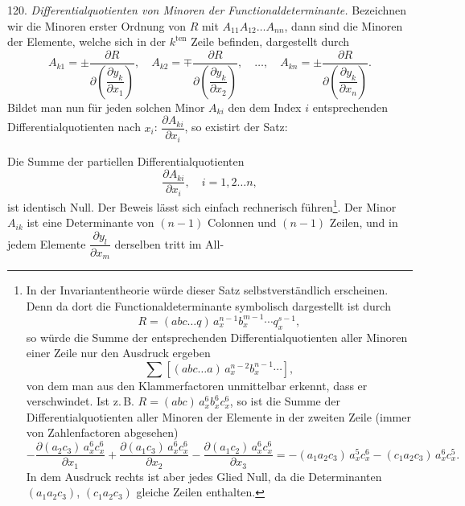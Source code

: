 \documentclass[11pt]{article}
\providecommand{\weberpage}[1]{}
\begin{document}
120. \textit{Differentialquotienten von Minoren der Functionaldeterminante.} Bezeichnen wir die Minoren erster Ordnung von $R$ mit $A_{11} A_{12} \ldots A_{nn}$, dann sind die Minoren der Elemente, welche sich in der $k^{\mathrm{ten}}$ Zeile befinden, dargestellt durch
\[
A_{k1} = \pm \dfrac{\partial R}{\partial\left(\dfrac{\partial y_k}{\partial x_1}\right)}, \quad
A_{k2} = \mp \dfrac{\partial R}{\partial\left(\dfrac{\partial y_k}{\partial x_2}\right)}, \quad \ldots, \quad
A_{kn} = \pm \dfrac{\partial R}{\partial\left(\dfrac{\partial y_k}{\partial x_n}\right)}.
\]
Bildet man nun für jeden solchen Minor $A_{ki}$ den dem Index $i$ entsprechenden Differentialquotienten nach $x_i$: $\dfrac{\partial A_{ki}}{\partial x_i}$, so existirt der Satz:

\glqq Die Summe der partiellen Differentialquotienten
\[
\frac{\partial A_{ki}}{\partial x_i}, \quad i = 1, 2 \ldots n,
\]
ist identisch Null.\grqq{} Der Beweis lässt sich einfach rechnerisch führen\footnote{In der Invariantentheorie würde dieser Satz selbstverständlich erscheinen. Denn da dort die Functionaldeterminante symbolisch dargestellt ist durch
\[
R = (abc \ldots q)\, a_x^{n-1} b_x^{m-1} \cdots q_x^{s-1},
\]
so würde die Summe der entsprechenden Differentialquotienten aller Minoren einer Zeile nur den Ausdruck ergeben
\[
\sum \left[ (abc \ldots a)\, a_x^{n-2} b_x^{n-1} \cdots \right],
\]
von dem man aus den Klammerfactoren unmittelbar erkennt, dass er verschwindet. Ist z.\,B. $R = (abc)\, a_x^6 b_x^6 c_x^6$, so ist die Summe der Differentialquotienten aller Minoren der Elemente in der zweiten Zeile (immer von Zahlenfactoren abgesehen)
\[
- \frac{\partial(a_2 c_3)\, a_x^6 c_x^6}{\partial x_1} + \frac{\partial(a_1 c_3)\, a_x^6 c_x^6}{\partial x_2} - \frac{\partial(a_1 c_2)\, a_x^6 c_x^6}{\partial x_3}
= -(a_1 a_2 c_3)\, a_x^5 c_x^6 - (c_1 a_2 c_3)\, a_x^6 c_x^5.
\]
In dem Ausdruck rechts ist aber jedes Glied Null, da die Determinanten $(a_1 a_2 c_3)$, $(c_1 a_2 c_3)$ gleiche Zeilen enthalten.}. Der Minor $A_{ik}$ ist eine Determinante von $(n-1)$ Colonnen und $(n-1)$ Zeilen, und in jedem Elemente $\dfrac{\partial y_l}{\partial x_m}$ derselben tritt im All-


\weberpage{128}
\end{document}
